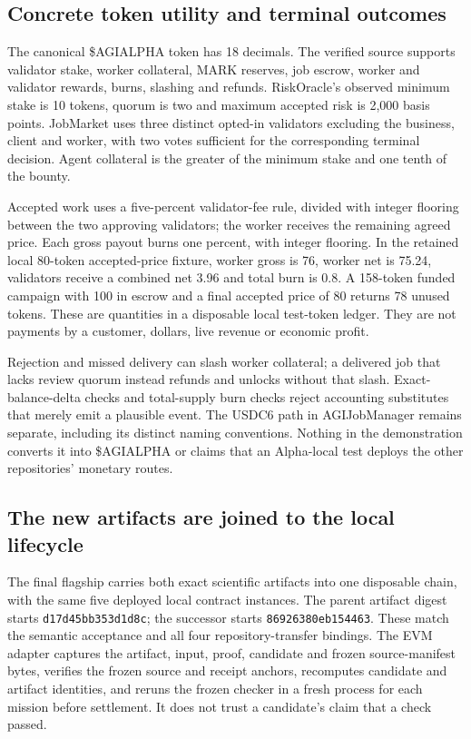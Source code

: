 \documentclass[11pt]{article}
\begin{document}
\subsection{Concrete token utility and terminal outcomes}

The canonical \$AGIALPHA token has 18 decimals. The verified source supports validator stake, worker collateral, MARK reserves, job escrow, worker and validator rewards, burns, slashing and refunds. RiskOracle's observed minimum stake is 10 tokens, quorum is two and maximum accepted risk is 2,000 basis points. JobMarket uses three distinct opted-in validators excluding the business, client and worker, with two votes sufficient for the corresponding terminal decision. Agent collateral is the greater of the minimum stake and one tenth of the bounty.

Accepted work uses a five-percent validator-fee rule, divided with integer flooring between the two approving validators; the worker receives the remaining agreed price. Each gross payout burns one percent, with integer flooring. In the retained local 80-token accepted-price fixture, worker gross is 76, worker net is 75.24, validators receive a combined net 3.96 and total burn is 0.8. A 158-token funded campaign with 100 in escrow and a final accepted price of 80 returns 78 unused tokens. These are quantities in a disposable local test-token ledger. They are not payments by a customer, dollars, live revenue or economic profit.

Rejection and missed delivery can slash worker collateral; a delivered job that lacks review quorum instead refunds and unlocks without that slash. Exact-balance-delta checks and total-supply burn checks reject accounting substitutes that merely emit a plausible event. The USDC6 path in AGIJobManager remains separate, including its distinct naming conventions. Nothing in the demonstration converts it into \$AGIALPHA or claims that an Alpha-local test deploys the other repositories' monetary routes.

\subsection{The new artifacts are joined to the local lifecycle}

The final flagship carries both exact scientific artifacts into one disposable chain, with the same five deployed local contract instances. The parent artifact digest starts \texttt{d17d45bb353d1d8c}; the successor starts \texttt{86926380eb154463}. These match the semantic acceptance and all four repository-transfer bindings. The EVM adapter captures the artifact, input, proof, candidate and frozen source-manifest bytes, verifies the frozen source and receipt anchors, recomputes candidate and artifact identities, and reruns the frozen checker in a fresh process for each mission before settlement. It does not trust a candidate's claim that a check passed.
\end{document}
